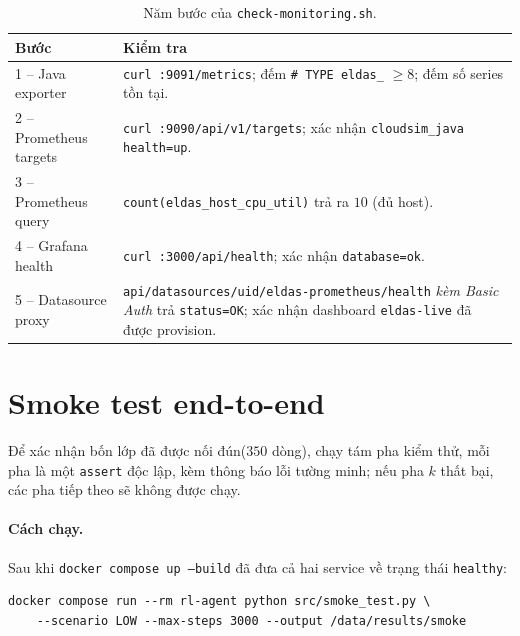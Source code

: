 \begin{table}[H]
  \centering
  \caption{Năm bước của \texttt{check-monitoring.sh}.}
  \label{tab:t57-steps}
  \footnotesize
  \begin{tabularx}{\linewidth}{l X}
    \toprule
    \textbf{Bước} & \textbf{Kiểm tra} \\
    \midrule
    1 -- Java exporter
        & \texttt{curl :9091/metrics}; đếm \texttt{\# TYPE eldas\_} $\geq 8$;
          đếm số series tồn tại. \\
    2 -- Prometheus targets
        & \texttt{curl :9090/api/v1/targets}; xác nhận
          \texttt{cloudsim\_java} \texttt{health=up}. \\
    3 -- Prometheus query
        & \texttt{count(eldas\_host\_cpu\_util)} trả ra $10$
          (đủ host). \\
    4 -- Grafana health
        & \texttt{curl :3000/api/health}; xác nhận
          \texttt{database=ok}. \\
    5 -- Datasource proxy
        & \texttt{api/datasources/uid/eldas-prometheus/health}
          \emph{kèm Basic Auth} trả \texttt{status=OK}; xác nhận
          dashboard \texttt{eldas-live} đã được provision. \\
    \bottomrule
  \end{tabularx}
\end{table}

\section{Smoke test end-to-end}
\label{sec:impl-smoke}

Để xác nhận bốn lớp đã được nối đún($350$ dòng), chạy tám pha kiểm thử, mỗi pha là một
\texttt{assert} độc lập, kèm thông báo lỗi tường minh; nếu pha $k$
thất bại, các pha tiếp theo sẽ không được chạy.

\paragraph{Cách chạy.}
Sau khi \texttt{docker compose up --build} đã đưa cả hai service về
trạng thái \texttt{healthy}:
\begin{lstlisting}[style=yamlstyle, caption={Lệnh chạy smoke test.}, label={lst:run-smoke}]
docker compose run --rm rl-agent python src/smoke_test.py \
    --scenario LOW --max-steps 3000 --output /data/results/smoke
\end{lstlisting}

